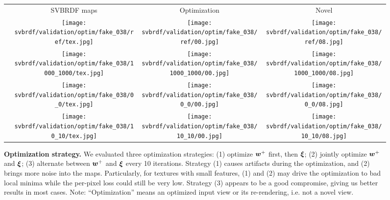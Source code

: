 \begin{figure}[h]
	\centering
	\setlength{\resLen}{1.in}
	\setlength{\raiseLen}{0.4in}
	\addtolength{\tabcolsep}{-4pt}
	\begin{tabular}{cccc}
		  & SVBRDF maps & Optimization & Novel
		\\
		\raisebox{\raiseLen}{\rotatebox[origin=c]{90}{GT}} &
		\texttt{[image: svbrdf/validation/optim/fake\_038/ref/tex.jpg]} &
		\texttt{[image: svbrdf/validation/optim/fake\_038/ref/00.jpg]} &
		\texttt{[image: svbrdf/validation/optim/fake\_038/ref/08.jpg]}
		\\
		\raisebox{\raiseLen}{\rotatebox[origin=c]{0}{(1)}} &
		\texttt{[image: svbrdf/validation/optim/fake\_038/1000\_1000/tex.jpg]} &
		\texttt{[image: svbrdf/validation/optim/fake\_038/1000\_1000/00.jpg]} &
		\texttt{[image: svbrdf/validation/optim/fake\_038/1000\_1000/08.jpg]}
		\\
		\raisebox{\raiseLen}{\rotatebox[origin=c]{0}{(2)}} &
		\texttt{[image: svbrdf/validation/optim/fake\_038/0\_0/tex.jpg]} &
		\texttt{[image: svbrdf/validation/optim/fake\_038/0\_0/00.jpg]} &
		\texttt{[image: svbrdf/validation/optim/fake\_038/0\_0/08.jpg]}
		\\
		\raisebox{\raiseLen}{\rotatebox[origin=c]{0}{(3)}} &
		\texttt{[image: svbrdf/validation/optim/fake\_038/10\_10/tex.jpg]} &
		\texttt{[image: svbrdf/validation/optim/fake\_038/10\_10/00.jpg]} &
		\texttt{[image: svbrdf/validation/optim/fake\_038/10\_10/08.jpg]}
	\end{tabular}
	\caption[Optimization strategy]{\label{fig:svbrdf:strategy}
		\textbf{Optimization strategy.} We evaluated three optimization strategies: (1) optimize $\bm{w}^+$ first, then $\bm\xi$; (2) jointly optimize $\bm{w}^+$ and $\bm\xi$; (3) alternate between $\bm{w}^+$ and $\bm\xi$ every 10 iterations. Strategy (1) causes artifacts during the optimization, and (2) brings more noise into the maps. Particularly, for textures with small features, (1) and (2) may drive the optimization to bad local minima while the per-pixel loss could still be very low. Strategy (3) appears to be a good compromise, giving us better results in most cases. Note: ``Optimization'' means an optimized input view or its re-rendering, i.e. not a novel view.
	}
\end{figure}
